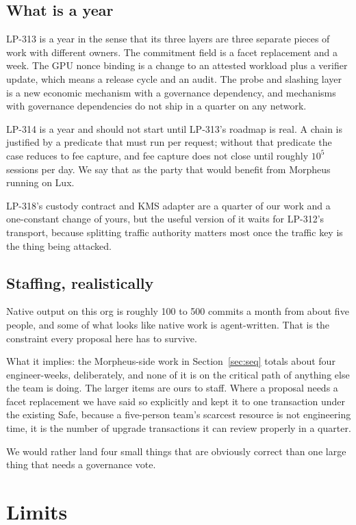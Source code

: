 \documentclass[11pt,a4paper]{article}
\begin{document}
\subsection{What is a year}

LP-313 is a year in the sense that its three layers are three separate pieces of
work with different owners. The commitment field is a facet replacement and a
week. The GPU nonce binding is a change to an attested workload plus a verifier
update, which means a release cycle and an audit. The probe and slashing layer
is a new economic mechanism with a governance dependency, and mechanisms with
governance dependencies do not ship in a quarter on any network.

LP-314 is a year and should not start until LP-313's roadmap is real. A chain is
justified by a predicate that must run per request; without that predicate the
case reduces to fee capture, and fee capture does not close until roughly
$10^5$ sessions per day. We say that as the party that would benefit from
Morpheus running on Lux.

LP-318's custody contract and KMS adapter are a quarter of our work and a
one-constant change of yours, but the useful version of it waits for LP-312's
transport, because splitting traffic authority matters most once the traffic key
is the thing being attacked.

\subsection{Staffing, realistically}

Native output on this org is roughly 100 to 500 commits a month from about five
people, and some of what looks like native work is agent-written. That is the
constraint every proposal here has to survive.

What it implies: the Morpheus-side work in Section~\ref{sec:seq} totals about
four engineer-weeks, deliberately, and none of it is on the critical path of
anything else the team is doing. The larger items are ours to staff. Where a
proposal needs a facet replacement we have said so explicitly and kept it to one
transaction under the existing Safe, because a five-person team's scarcest
resource is not engineering time, it is the number of upgrade transactions it
can review properly in a quarter.

We would rather land four small things that are obviously correct than one large
thing that needs a governance vote.

\section{Limits}
\label{sec:limits}
\end{document}
